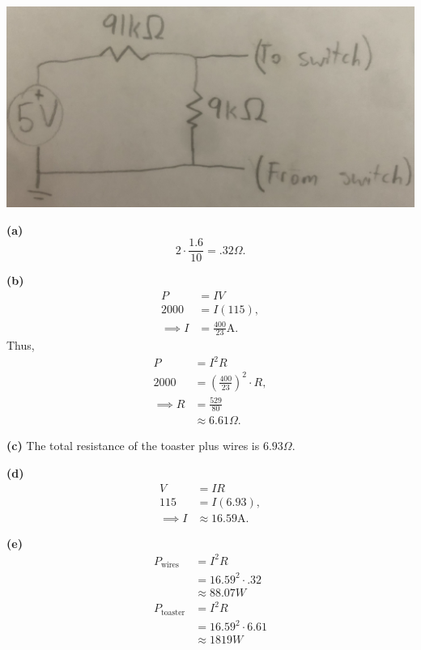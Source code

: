 \documentclass{article}
\begin{document}
\bigskip
{}

    \begin{center}
    \includegraphics[scale=.1]{switch_circuit.jpg}
    \end{center}

\newpage
{}

{\bf (a)} $$2\cdot\frac{1.6}{10}=.32\Omega.$$

\medskip
{\bf (b)}
\begin{align*}
    P &= IV \\
    2000 &= I(115), \\
    \implies I &= \frac{400}{23}\text{A}.
\end{align*}
Thus,
\begin{align*}
    P &= I^2R \\
    2000 &= \left(\frac{400}{23}\right)^2 \cdot R, \\
    \implies R &= \frac{529}{80} \\
    &\approx 6.61\Omega.
\end{align*}

\medskip
{\bf (c)} The total resistance of the toaster plus wires is $6.93\Omega$.

\medskip
{\bf (d)}
\begin{align*}
    V &= IR \\
    115 &= I(6.93), \\
    \implies I &\approx 16.59\text{A}.
\end{align*}

\medskip
{\bf (e)}
\begin{align*}
    P_{\text{wires}} &= I^2R \\
                     &= 16.59^2 \cdot .32 \\
                     &\approx 88.07W \\
    P_{\text{toaster}} &= I^2R \\
                       &= 16.59^2 \cdot 6.61 \\
                       &\approx 1819W
\end{align*}
\end{document}
